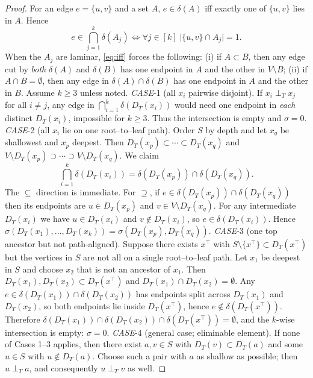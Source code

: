 \documentclass[11pt,letterpaper]{article}
\newcommand{\CASE}[1]{\emph{CASE}-#1}
\begin{document}
\begin{proof}
For an edge $e=\{u,v\}$ and a set $A$, $e\in\delta(A)$ iff exactly one of $\{u,v\}$ lies in $A$.
Hence
\begin{equation}\label{eq:iff}
e\in\bigcap_{j=1}^k \delta(A_j)
\iff
\forall j\in[k]\; \bigl|\{u,v\}\cap A_j\bigr|=1.
\end{equation}
When the $A_j$ are laminar, \eqref{eq:iff} forces the following:
(i) if $A\subset B$, then any edge cut by \emph{both} $\delta(A)$ and $\delta(B)$
has one endpoint in $A$ and the other in $V\setminus B$;
(ii) if $A\cap B=\emptyset$, then any edge in $\delta(A)\cap\delta(B)$
has one endpoint in $A$ and the other in $B$. Assume $k\ge3$ unless noted.
\smallskip
\noindent\CASE{1} (all $x_i$ pairwise disjoint).
If $x_i\perp_T x_j$ for all $i\neq j$, any edge in
$\bigcap_{i=1}^k \delta(D_T(x_i))$ would need one endpoint in
\emph{each} distinct $D_T(x_i)$, impossible for $k\ge3$. Thus the
intersection is empty and $\sigma=0$.
\medskip
\noindent\CASE{2} (all $x_i$ lie on one root--to--leaf path).
Order $S$ by depth and let $x_q$ be shallowest and $x_p$ deepest.
Then $D_T(x_p)\subset\cdots\subset D_T(x_q)$ and
$V\setminus D_T(x_p)\supset\cdots\supset V\setminus D_T(x_q)$.
We claim
\[
\bigcap_{i=1}^k \delta(D_T(x_i))=\delta(D_T(x_p))\cap\delta(D_T(x_q)).
\]
The $\subseteq$ direction is immediate. For $\supseteq$, if
$e\in\delta(D_T(x_p))\cap\delta(D_T(x_q))$ then its endpoints are
$u\in D_T(x_p)$ and $v\in V\setminus D_T(x_q)$. For any intermediate
$D_T(x_i)$ we have $u\in D_T(x_i)$ and $v\notin D_T(x_i)$, so
$e\in\delta(D_T(x_i))$. Hence
$\sigma(D_T(x_1),\ldots,D_T(x_k))=\sigma(D_T(x_p),D_T(x_q))$.
\medskip
\noindent\CASE{3} (one top ancestor but not path-aligned).
Suppose there exists $x^\top$ with $S\setminus\{x^\top\}\subset D_T(x^\top)$
but the vertices in $S$ are not all on a single root--to--leaf path.
Let $x_1$ be deepest in $S$ and choose $x_2$ that is not an ancestor of $x_1$.
Then $D_T(x_1),D_T(x_2)\subset D_T(x^\top)$ and $D_T(x_1)\cap D_T(x_2)=\emptyset$.
Any $e\in\delta(D_T(x_1))\cap\delta(D_T(x_2))$ has endpoints split across
$D_T(x_1)$ and $D_T(x_2)$, so both endpoints lie inside $D_T(x^\top)$,
hence $e\notin\delta(D_T(x^\top))$. Therefore
$\delta(D_T(x_1))\cap\delta(D_T(x_2))\cap\delta(D_T(x^\top))=\emptyset$,
and the $k$-wise intersection is empty: $\sigma=0$.
\medskip
\noindent\CASE{4} (general case; eliminable element).
If none of Cases 1--3 applies, then there exist $a,v\in S$ with
$D_T(v)\subset D_T(a)$ and some $u\in S$ with $u\notin D_T(a)$.
Choose such a pair with $a$ as shallow as possible; then $u\perp_T a$,
and consequently $u\perp_T v$ as well.


\end{proof}
\end{document}
